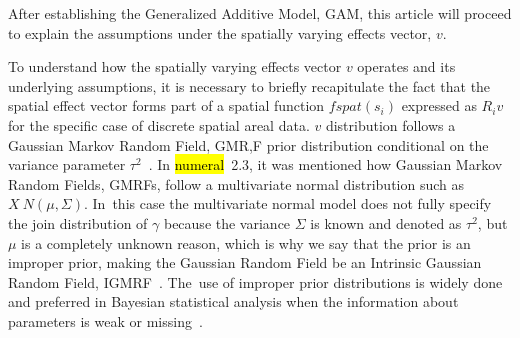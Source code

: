 \documentclass[energies,article,accept,pdftex,moreauthors]{Definitions/mdpi}
\begin{document}
    After establishing the Generalized Additive Model, GAM, this article will proceed to explain the assumptions under the spatially varying effects vector, $v$.
    
    To understand how the spatially varying effects vector $v$ operates and its underlying assumptions, it is necessary to briefly recapitulate the fact that the spatial effect vector forms part of a spatial function $fspat(s_i)$ expressed as $R_iv$ for the specific case of discrete spatial areal data. 
    $v$ distribution follows a Gaussian Markov Random Field, GMR,F prior distribution conditional on the variance parameter $\tau^2$~\citep{Fahrmeir2004PENALIZEDPERSPECTIVE}. In \hl{numeral}~2.3,%
     it was mentioned how Gaussian Markov Random Fields, GMRFs, follow a multivariate normal distribution such as \(X~N(\mu,\Sigma)\). In~this case the multivariate normal model does not fully specify the join distribution of $\gamma$ because the variance $\Sigma$ is known and denoted as $\tau^2$,  but $\mu$ is a completely unknown reason, which is why we say that the prior is an improper prior, making the Gaussian Random Field be an Intrinsic Gaussian Random Field,  IGMRF~\citep{Faulkner2018LocallyPriors}. The~use of improper prior distributions is widely done and preferred in Bayesian statistical analysis when the information about parameters is weak or missing~\citep{Held2020LikelihoodInference}.
\end{document}
